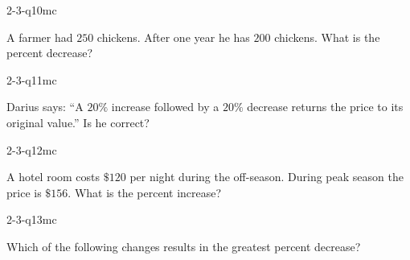 \begin{practiceQuestion}{2-3-q10}{mc}
\begin{questionText}
A farmer had $250$ chickens. After one year he has $200$ chickens. What is the percent decrease?
\end{questionText}
\end{practiceQuestion}

\begin{practiceQuestion}{2-3-q11}{mc}
\begin{questionText}
Darius says: ``A $20\%$ increase followed by a $20\%$ decrease returns the price to its original value.'' Is he correct?
\end{questionText}
\end{practiceQuestion}

\begin{practiceQuestion}{2-3-q12}{mc}
\begin{questionText}
A hotel room costs $\$120$ per night during the off-season. During peak season the price is $\$156$. What is the percent increase?
\end{questionText}
\end{practiceQuestion}

\begin{practiceQuestion}{2-3-q13}{mc}
\begin{questionText}
Which of the following changes results in the greatest percent decrease?
\end{questionText}
\end{practiceQuestion}

